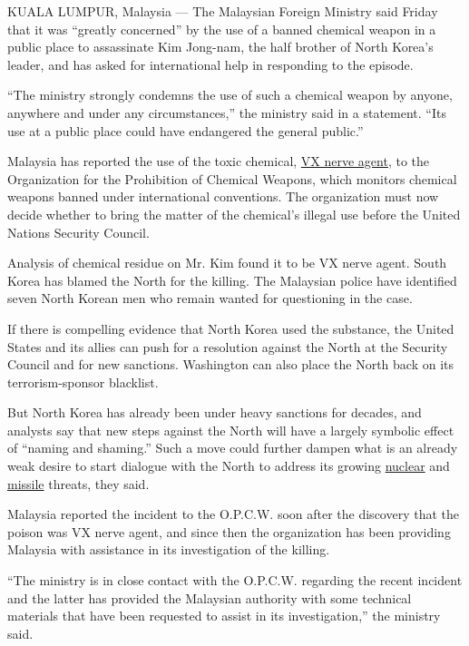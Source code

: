 KUALA LUMPUR, Malaysia --- The Malaysian Foreign Ministry said Friday
that it was ``greatly concerned'' by the use of a banned chemical weapon
in a public place to assassinate Kim Jong-nam, the half brother of North
Korea's leader, and has asked for international help in responding to
the episode.

``The ministry strongly condemns the use of such a chemical weapon by
anyone, anywhere and under any circumstances,'' the ministry said in a
statement. ``Its use at a public place could have endangered the general
public.''

Malaysia has reported the use of the toxic chemical,
\href{https://www.nytimes3xbfgragh.onion/2017/02/24/world/asia/vx-nerve-agent-kim-jong-nam.html?_r=0}{VX
nerve agent}, to the Organization for the Prohibition of Chemical
Weapons, which monitors chemical weapons banned under international
conventions. The organization must now decide whether to bring the
matter of the chemical's illegal use before the United Nations Security
Council.

Analysis of chemical residue on Mr. Kim found it to be VX nerve agent.
South Korea has blamed the North for the killing. The Malaysian police
have identified seven North Korean men who remain wanted for questioning
in the case.

If there is compelling evidence that North Korea used the substance, the
United States and its allies can push for a resolution against the North
at the Security Council and for new sanctions. Washington can also place
the North back on its terrorism-sponsor blacklist.

But North Korea has already been under heavy sanctions for decades, and
analysts say that new steps against the North will have a largely
symbolic effect of ``naming and shaming.'' Such a move could further
dampen what is an already weak desire to start dialogue with the North
to address its growing
\href{https://www.nytimes3xbfgragh.onion/topic/subject/north-koreas-nuclear-program}{nuclear}
and
\href{https://www.nytimes3xbfgragh.onion/2017/02/11/world/asia/north-korea-missile-test-trump.html}{missile}
threats, they said.

Malaysia reported the incident to the O.P.C.W. soon after the discovery
that the poison was VX nerve agent, and since then the organization has
been providing Malaysia with assistance in its investigation of the
killing.

``The ministry is in close contact with the O.P.C.W. regarding the
recent incident and the latter has provided the Malaysian authority with
some technical materials that have been requested to assist in its
investigation,'' the ministry said.

